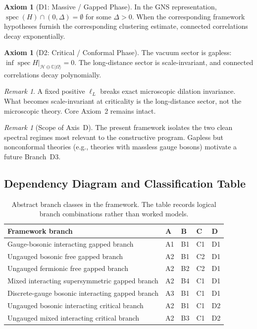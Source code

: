 \documentclass[12pt,a4paper]{article}
\theoremstyle{plain}
\theoremstyle{definition}
\newtheorem{axiom}[theorem]{Axiom}
\theoremstyle{remark}
\newtheorem{remark}[theorem]{Remark}
\newcommand{\spec}{\operatorname{spec}}
\newcommand{\hilb}{\mathcal{H}}
\begin{document}
\begin{axiom}[D1: Massive / Gapped Phase]\label{ax:D1}
  In the GNS representation, $\spec(H) \cap (0, \Delta) = \emptyset$
  for some $\Delta > 0$. When the corresponding framework hypotheses
  furnish the
  corresponding clustering estimate, connected correlations decay
  exponentially.
\end{axiom}

\begin{axiom}[D2: Critical / Conformal Phase]\label{ax:D2}
  The vacuum sector is gapless:
  $\inf \spec H|_{\hilb \ominus \mathbb{C}|\Omega\rangle} = 0$. The
  long-distance sector is scale-invariant, and connected correlations
  decay polynomially.
\end{axiom}

\begin{remark}
  A fixed positive $\ell_L$ breaks exact microscopic dilation
  invariance. What becomes scale-invariant at criticality is the
  long-distance sector, not the microscopic theory. Core Axiom~2
  remains intact.
\end{remark}

\begin{remark}[Scope of Axis~D]
  The present framework isolates the two clean spectral regimes most
  relevant to the constructive program. Gapless but nonconformal
  theories (e.g., theories with massless gauge bosons) motivate a
  future Branch~D3.
\end{remark}


\subsection{Dependency Diagram and Classification Table}

\begin{table}[ht]
\centering
\renewcommand{\arraystretch}{1.2}
\begin{tabular}{@{}p{3.4cm}p{1.3cm}p{1.3cm}p{1.3cm}p{3.8cm}@{}}
\toprule
Framework branch & A & B & C & D \\
\midrule
Gauge-bosonic interacting gapped branch & A1 & B1 & C1 & D1 \\
Ungauged bosonic free gapped branch & A2 & B1 & C2 & D1 \\
Ungauged fermionic free gapped branch & A2 & B2 & C2 & D1 \\
Mixed interacting supersymmetric gapped branch & A2 & B4 & C1 & D1 \\
Discrete-gauge bosonic interacting gapped branch & A3 & B1 & C1 & D1 \\
Ungauged bosonic interacting critical branch & A2 & B1 & C1 & D2 \\
Ungauged mixed interacting critical branch & A2 & B3 & C1 & D2 \\
\bottomrule
\end{tabular}
\caption{Abstract branch classes in the framework. The table records
  logical branch combinations rather than worked models.}
\label{tab:theories}
\end{table}
\end{document}
